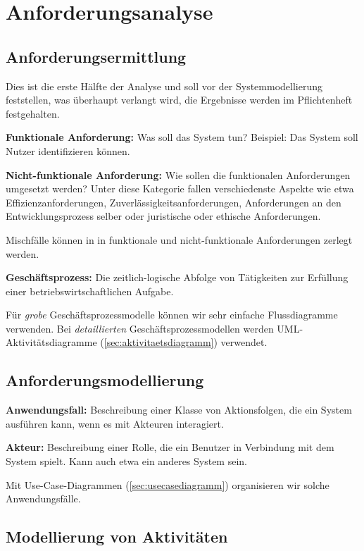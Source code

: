 \documentclass{panikzettel}
\begin{document}
\section{Anforderungsanalyse}

\subsection{Anforderungsermittlung}

Dies ist die erste Hälfte der Analyse und soll vor der Systemmodellierung feststellen, was überhaupt verlangt wird, die Ergebnisse werden im Pflichtenheft festgehalten.

\textbf{Funktionale Anforderung:} Was soll das System tun?
Beispiel: Das System soll Nutzer identifizieren können.

\textbf{Nicht-funktionale Anforderung:} Wie sollen die funktionalen Anforderungen umgesetzt werden?
Unter diese Kategorie fallen verschiedenste Aspekte wie etwa Effizienzanforderungen, Zuverlässigkeitsanforderungen, Anforderungen an den Entwicklungsprozess selber oder juristische oder ethische Anforderungen.

Mischfälle können in in funktionale und nicht-funktionale Anforderungen zerlegt werden.

\textbf{Geschäftsprozess:} Die zeitlich-logische Abfolge von Tätigkeiten zur Erfüllung einer betriebswirtschaftlichen Aufgabe.

Für \emph{grobe} Geschäftsprozessmodelle können wir sehr einfache Flussdiagramme verwenden.
Bei \emph{detaillierten} Geschäftsprozessmodellen werden UML-Aktivitätsdiagramme (\ref{sec:aktivitaetsdiagramm}) verwendet.

\subsection{Anforderungsmodellierung}

\textbf{Anwendungsfall:} Beschreibung einer Klasse von Aktionsfolgen, die ein System ausführen kann, wenn es mit Akteuren interagiert.

\textbf{Akteur:} Beschreibung einer Rolle, die ein Benutzer in Verbindung mit dem System spielt.
Kann auch etwa ein anderes System sein.

Mit Use-Case-Diagrammen (\ref{sec:usecasediagramm}) organisieren wir solche Anwendungsfälle.

\subsection{Modellierung von Aktivitäten}
\end{document}
